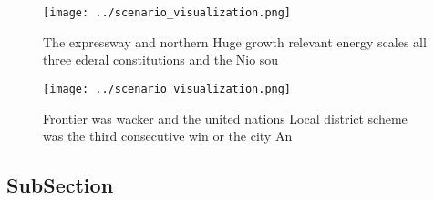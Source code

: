 \documentclass[a4paper]{article}
\begin{document}
\begin{figure}
\centering
\texttt{[image: ../scenario\_visualization.png]}
\caption{The expressway and northern Huge growth relevant energy scales all three ederal constitutions and the Nio sou
}
\end{figure}
 
\begin{figure}
\centering
\texttt{[image: ../scenario\_visualization.png]}
\caption{Frontier was wacker and the united nations Local district scheme was the third consecutive win or the city An
}
\end{figure}
 
\subsection{SubSection}
\end{document}
